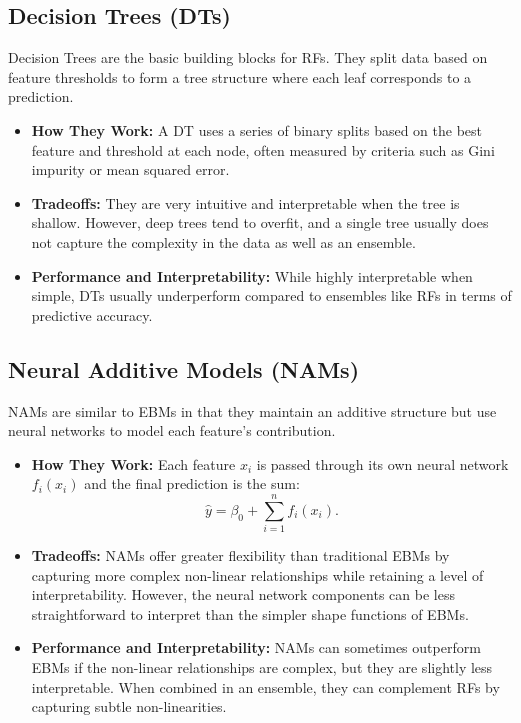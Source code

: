 \documentclass{article}
\begin{document}
\subsection*{Decision Trees (DTs)}
Decision Trees are the basic building blocks for RFs. They split data based on feature thresholds to form a tree structure where each leaf corresponds to a prediction.  
\begin{itemize}
    \item \textbf{How They Work:} A DT uses a series of binary splits based on the best feature and threshold at each node, often measured by criteria such as Gini impurity or mean squared error.
    \item \textbf{Tradeoffs:} They are very intuitive and interpretable when the tree is shallow. However, deep trees tend to overfit, and a single tree usually does not capture the complexity in the data as well as an ensemble.
    \item \textbf{Performance and Interpretability:} While highly interpretable when simple, DTs usually underperform compared to ensembles like RFs in terms of predictive accuracy.
\end{itemize}

\subsection*{Neural Additive Models (NAMs)}
NAMs are similar to EBMs in that they maintain an additive structure but use neural networks to model each feature's contribution.  
\begin{itemize}
    \item \textbf{How They Work:} Each feature \(x_i\) is passed through its own neural network \(f_i(x_i)\) and the final prediction is the sum:
    \[
    \hat{y} = \beta_0 + \sum_{i=1}^{n} f_i(x_i).
    \]
    \item \textbf{Tradeoffs:} NAMs offer greater flexibility than traditional EBMs by capturing more complex non-linear relationships while retaining a level of interpretability. However, the neural network components can be less straightforward to interpret than the simpler shape functions of EBMs.
    \item \textbf{Performance and Interpretability:} NAMs can sometimes outperform EBMs if the non-linear relationships are complex, but they are slightly less interpretable. When combined in an ensemble, they can complement RFs by capturing subtle non-linearities.
\end{itemize}
\end{document}
